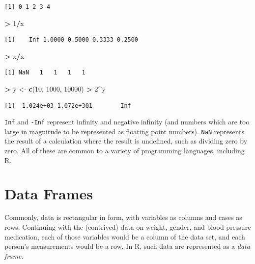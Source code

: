 \documentclass[]{krantz}
\makeatletter
\newenvironment{Shaded}{\begin{snugshade}}{\end{snugshade}}
\newcommand{\KeywordTok}[1]{\textcolor[rgb]{0.27,0.27,0.27}{\textbf{#1}}}
\newcommand{\DecValTok}[1]{\textcolor[rgb]{0.06,0.06,0.06}{#1}}
\newcommand{\StringTok}[1]{\textcolor[rgb]{0.5,0.5,0.5}{#1}}
\newcommand{\OperatorTok}[1]{\textcolor[rgb]{0.43,0.43,0.43}{\textbf{#1}}}
\newcommand{\NormalTok}[1]{#1}
\newenvironment{kframe}{%
\medskip{}
\setlength{\fboxsep}{.8em}
 \def\at@end@of@kframe{}%
 \ifinner\ifhmode%
  \def\at@end@of@kframe{\end{minipage}}%
  \begin{minipage}{\columnwidth}%
 \fi\fi%
 \def\FrameCommand##1{\hskip\@totalleftmargin \hskip-\fboxsep
 \colorbox{shadecolor}{##1}\hskip-\fboxsep
     \hskip-\linewidth \hskip-\@totalleftmargin \hskip\columnwidth}%
 \MakeFramed {\advance\hsize-\width
   \@totalleftmargin\z@ \linewidth\hsize
   \@setminipage}}%
 {\par\unskip\endMakeFramed%
 \at@end@of@kframe}
\renewenvironment{Shaded}{\begin{kframe}}{\end{kframe}}
\makeatother
\begin{document}
\begin{verbatim}
[1] 0 1 2 3 4
\end{verbatim}

\begin{Shaded}
\begin{Highlighting}[]
\OperatorTok{>}\StringTok{ }\DecValTok{1}\OperatorTok{/}\NormalTok{x}
\end{Highlighting}
\end{Shaded}

\begin{verbatim}
[1]    Inf 1.0000 0.5000 0.3333 0.2500
\end{verbatim}

\begin{Shaded}
\begin{Highlighting}[]
\OperatorTok{>}\StringTok{ }\NormalTok{x}\OperatorTok{/}\NormalTok{x}
\end{Highlighting}
\end{Shaded}

\begin{verbatim}
[1] NaN   1   1   1   1
\end{verbatim}

\begin{Shaded}
\begin{Highlighting}[]
\OperatorTok{>}\StringTok{ }\NormalTok{y <-}\StringTok{ }\KeywordTok{c}\NormalTok{(}\DecValTok{10}\NormalTok{, }\DecValTok{1000}\NormalTok{, }\DecValTok{10000}\NormalTok{)}
\OperatorTok{>}\StringTok{ }\DecValTok{2}\OperatorTok{^}\NormalTok{y}
\end{Highlighting}
\end{Shaded}

\begin{verbatim}
[1]  1.024e+03 1.072e+301        Inf
\end{verbatim}

\texttt{Inf} and \texttt{-Inf} represent infinity and negative infinity
(and numbers which are too large in magnitude to be represented as
floating point numbers). \texttt{NaN} represents the result of a
calculation where the result is undefined, such as dividing zero by
zero. All of these are common to a variety of programming languages,
including R.

\section{Data Frames}\label{dataFrames}

Commonly, data is rectangular in form, with variables as columns and
cases as rows. Continuing with the (contrived) data on weight, gender,
and blood pressure medication, each of those variables would be a column
of the data set, and each person's measurements would be a row. In R,
such data are represented as a \emph{data frame}.
\end{document}
